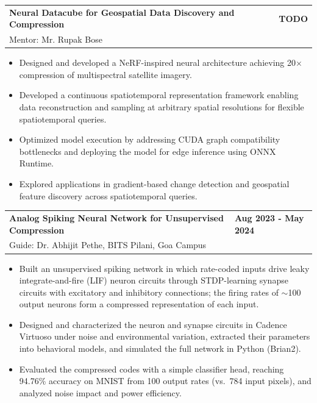 \documentclass[letterpaper,11pt]{article}
\begin{document}
\begin{tabularx}{\linewidth}{ @{}l X@{} }
\textbf{Neural Datacube for Geospatial Data Discovery and Compression} & \hfill \textbf{TODO} \\
Mentor: Mr. Rupak Bose
\end{tabularx}
\vspace{-1.2em}
\begin{itemize}
    \item[--] Designed and developed a NeRF-inspired neural architecture achieving 20$\times$ compression of multispectral satellite imagery. \vspace{-0.5em} %
    \item[--] Developed a continuous spatiotemporal representation framework enabling data reconstruction and sampling at arbitrary spatial resolutions for flexible spatiotemporal queries. \vspace{-0.5em}
    \item[--] Optimized model execution by addressing CUDA graph compatibility bottlenecks and deploying the model for edge inference using ONNX Runtime. \vspace{-0.5em}
    \item[--] Explored applications in gradient-based change detection and geospatial feature discovery across spatiotemporal queries.
\end{itemize}
\vspace{0.3em}


\begin{tabularx}{\linewidth}{ @{}l X@{} }
\textbf{Analog Spiking Neural Network for Unsupervised Compression} & \hfill \textbf{Aug 2023 - May 2024}  \\
Guide: Dr. Abhijit Pethe, BITS Pilani, Goa Campus
\end{tabularx}
\vspace{-1.2em}
\begin{itemize}
    \item[--] Built an unsupervised spiking network in which rate-coded inputs drive leaky integrate-and-fire (LIF) neuron circuits through STDP-learning synapse circuits with excitatory and inhibitory connections; the firing rates of $\sim$100 output neurons form a compressed representation of each input. \vspace{-0.5em}
    \item[--] Designed and characterized the neuron and synapse circuits in Cadence Virtuoso under noise and environmental variation, extracted their parameters into behavioral models, and simulated the full network in Python (Brian2).\vspace{-0.5em}
    \item[--] Evaluated the compressed codes with a simple classifier head, reaching 94.76\% accuracy on MNIST from 100 output rates (vs.\ 784 input pixels), and analyzed noise impact and power efficiency.
\end{itemize}
\end{document}

